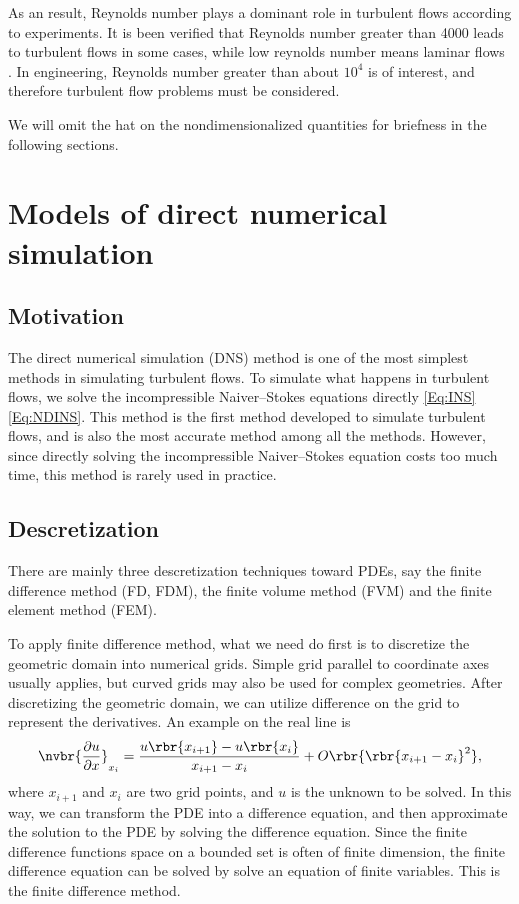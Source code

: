\documentclass[english, nochinese]{pkupaper}
\begin{document}
As an result, Reynolds number plays a dominant role in turbulent flows according to experiments. It is been verified that Reynolds number greater than 4000 leads to turbulent flows in some cases, while low reynolds number means laminar flows \parencite{holman_heat_1986}. In engineering, Reynolds number greater than about $10^4$ is of interest, and therefore turbulent flow problems must be considered.

We will omit the hat on the nondimensionalized quantities for briefness in the following sections.

\section{Models of direct numerical simulation} \label{Sec:DNS}

\subsection{Motivation}

The direct numerical simulation (DNS) method is one of the most simplest methods in simulating turbulent flows. To simulate what happens in turbulent flows, we solve the incompressible Naiver--Stokes equations directly \eqref{Eq:INS} \eqref{Eq:NDINS}. This method is the first method developed to simulate turbulent flows, and is also the most accurate method among all the methods. However, since directly solving the incompressible Naiver--Stokes equation costs too much time, this method is rarely used in practice.

\subsection{Descretization}

There are mainly three descretization techniques toward PDEs, say the finite difference method (FD, FDM), the finite volume method (FVM) and the finite element method (FEM).

To apply finite difference method, what we need do first is to discretize the geometric domain into numerical grids. Simple grid parallel to coordinate axes usually applies, but curved grids may also be used for complex geometries. After discretizing the geometric domain, we can utilize difference on the grid to represent the derivatives. An example on the real line is
\begin{equation}
\nvbr{\frac{\partial u}{\partial x}}_{x_i} = \frac{u\rbr{x_{i+1}} - u\rbr{x_i}}{x_{i+1} - x_i} + O \rbr{\rbr{ x_{ i + 1 } - x_i }^2},
\end{equation}
where $x_{i+1}$ and $x_i$ are two grid points, and $u$ is the unknown to be solved. In this way, we can transform the PDE into a difference equation, and then approximate the solution to the PDE by solving the difference equation. Since the finite difference functions space on a bounded set is often of finite dimension, the finite difference equation can be solved by solve an equation of finite variables. This is the finite difference method.
\end{document}
